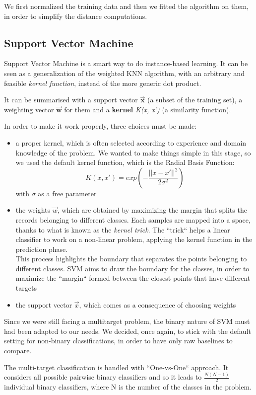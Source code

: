 We first normalized the training data and then we fitted the algorithm on them, in order to simplify the distance computations.

\subsection{Support Vector Machine}
Support Vector Machine is a smart way to do instance-based learning. It can be seen as a generalization of the weighted KNN algorithm, with an arbitrary and feasible \textit{kernel function}, instead of the more generic dot product.

It can be summarised with a support vector $ \mathbf{\vec{x}} $ (a subset of the training set), a weighting vector $ \mathbf{\vec{w}} $ for them and a \textbf{kernel} \textit{K(x, x')} (a similarity function).

In order to make it work properly, three choices must be made:
\begin{itemize}
	\item[\PencilRight] a proper kernel, which is often selected according to experience and domain knowledge of the problem. We wanted to make things simple in this stage, so we used the default kernel function, which is the Radial Basis Function:\label{rbf}
	\[ K(x, x') = exp(- \frac{||x-x'||^{2}}{2\sigma^{2}}) \]
	with $ \sigma $ as a free parameter
	\item[\PencilRight] the weights $ \vec{w} $, which are obtained by maximizing the margin that splits the records belonging to different classes. Each samples are mapped into a space, thanks to what is known as the \textit{kernel trick}. The ``trick`` helps a linear classifier to work on a non-linear problem, applying the kernel function in the prediction phase.\\This process highlights the boundary that separates the points belonging to different classes.
	SVM aims to draw the boundary for the classes, in order to maximize the ``margin`` formed between the closest points that have different targets
	\item[\PencilRight] the support vector $ \vec{x} $, which comes as a consequence of choosing weights
\end{itemize}
Since we were still facing a multitarget problem, the binary nature of SVM must had been adapted to our needs. We decided, once again, to stick with the default setting for non-binary classifications, in order to have only raw baselines to compare.

The multi-target classification is handled with ``One-vs-One`` approach.
It considers all possible pairwise binary classifiers and so it leads to $\frac{N(N-1)}{2}$ individual binary classifiers, where N is the number of the classes in the problem.

